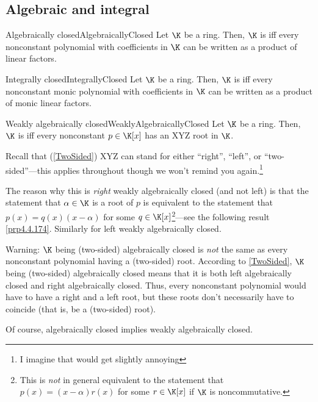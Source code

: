 \subsection{Algebraic and integral}

\begin{dfn}{Algebraically closed}{AlgebraicallyClosed}
	Let $\K$ be a ring.  Then, $\K$ is  iff every nonconstant polynomial with coefficients in $\K$ can be written as a product of linear factors.
\end{dfn}
\begin{dfn}{Integrally closed}{IntegrallyClosed}
	Let $\K$ be a ring.  Then, $\K$ is  iff every nonconstant monic polynomial with coefficients in $\K$ can be written as a product of monic linear factors.
\end{dfn}
\begin{mdf}{Weakly algebraically closed}{WeaklyAlgebraicallyClosed}
	Let $\K$ be a ring.  Then, $\K$ is  iff every nonconstant $p\in \K [x]$ has an XYZ root in $\K$.
	\begin{rmk}
		Recall that (\cref{TwoSided}) XYZ can stand for either ``right'', ``left'', or ``two-sided''---this applies throughout though we won't remind you again.\footnote{I imagine that would get slightly annoying\textellipsis}
	\end{rmk}
	\begin{rmk}
		The reason why this is \emph{right} weakly algebraically closed (and not left) is that the statement that $\alpha \in \K$ is a root of $p$ is equivalent to the statement that $p(x)=q(x)(x-\alpha )$ for some $q\in \K [x]$\footnote{This is \emph{not} in general equivalent to the statement that $p(x)=(x-\alpha )r(x)$ for some $r\in \K [x]$ if $\K$ is noncommutative.}---see the following result \cref{prp4.4.174}.  Similarly for left weakly algebraically closed.
	\end{rmk}
	\begin{rmk}
		Warning:  $\K$ being (two-sided) algebraically closed is \emph{not} the same as every nonconstant polynomial having a (two-sided) root.  According to \cref{TwoSided}, $\K$ being (two-sided) algebraically closed means that it is both left algebraically closed and right algebraically closed.  Thus, every nonconstant polynomial would have to have a right and a left root, but these roots don't necessarily have to coincide (that is, be a (two-sided) root).
	\end{rmk}
	\begin{rmk}
		Of course, algebraically closed implies weakly algebraically closed.
	\end{rmk}
\end{mdf}
